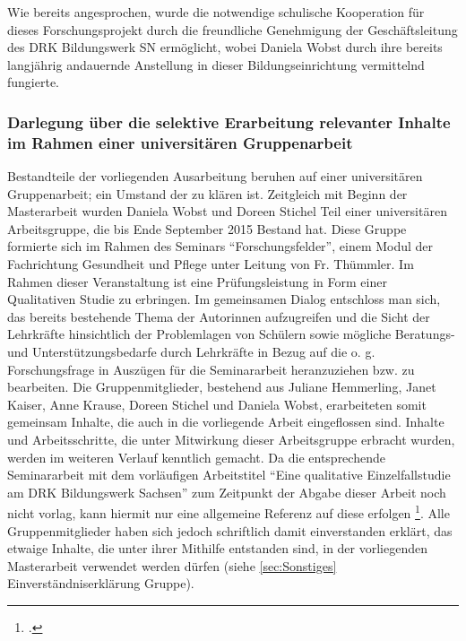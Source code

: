 Wie bereits angesprochen, wurde die notwendige schulische Kooperation für dieses Forschungsprojekt durch die freundliche Genehmigung der Geschäftsleitung des DRK Bildungswerk SN ermöglicht, wobei Daniela Wobst durch ihre bereits langjährig andauernde Anstellung in dieser Bildungseinrichtung vermittelnd fungierte. 

\subsubsection[Selektive Erarbeitung im Rahmen einer universitären Gruppenarbeit]{Darlegung über die selektive Erarbeitung relevanter Inhalte im Rahmen einer universitären Gruppenarbeit}
\label{sec:DarlegungÜberDieSelektiveErarbeitungRelevanterInhalteImRahmenEinerUniversitärenSeminararbeit}

Bestandteile der vorliegenden Ausarbeitung beruhen auf einer universitären Gruppenarbeit; ein Umstand der zu klären ist. Zeitgleich mit Beginn der Masterarbeit wurden Daniela Wobst und Doreen Stichel Teil einer universitären Arbeitsgruppe, die bis Ende September 2015 Bestand hat. Diese Gruppe formierte sich im Rahmen des Seminars "`Forschungsfelder"', einem Modul der Fachrichtung Gesundheit und Pflege unter Leitung von Fr. Thümmler. Im Rahmen dieser Veranstaltung ist eine Prüfungsleistung in Form einer Qualitativen Studie zu erbringen. Im gemeinsamen Dialog entschloss man sich, das bereits bestehende Thema der Autorinnen aufzugreifen und die Sicht der Lehrkräfte hinsichtlich der Problemlagen von Schülern sowie mögliche Beratungs- und Unterstützungsbedarfe durch Lehrkräfte in Bezug auf die o. g. Forschungsfrage in Auszügen für die Seminararbeit heranzuziehen bzw. zu bearbeiten. Die Gruppenmitglieder, bestehend aus Juliane Hemmerling, Janet Kaiser, Anne Krause, Doreen Stichel und Daniela Wobst, erarbeiteten somit gemeinsam Inhalte, die auch in die vorliegende Arbeit eingeflossen sind. Inhalte und Arbeitsschritte, die unter Mitwirkung dieser Arbeitsgruppe erbracht wurden, werden im weiteren Verlauf kenntlich gemacht. Da die entsprechende Seminararbeit mit dem vorläufigen Arbeitstitel "`Eine qualitative Einzelfallstudie am DRK Bildungswerk Sachsen"' zum Zeitpunkt der Abgabe dieser Arbeit noch nicht vorlag, kann hiermit nur eine allgemeine Referenz auf diese erfolgen \footcite{Hemmerling2015}. Alle Gruppenmitglieder haben sich jedoch schriftlich damit einverstanden erklärt, das etwaige Inhalte, die unter ihrer Mithilfe entstanden sind, in der vorliegenden Masterarbeit verwendet werden dürfen (siehe \ref{sec:Sonstiges} Einverständniserklärung Gruppe).

